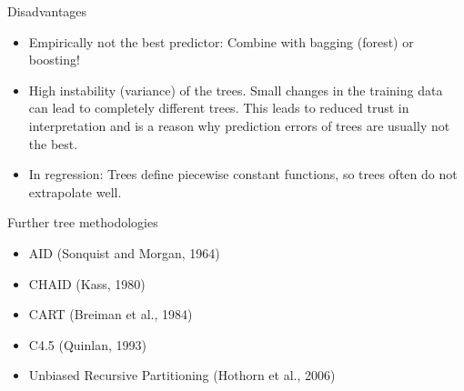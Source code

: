 \documentclass[11pt,compress,t,notes=noshow, xcolor=table]{beamer}
\begin{document}



\begin{vbframe}{Disadvantages}
\begin{itemize}
\item Empirically not the best predictor: Combine with bagging (forest) or boosting!
\item High instability (variance) of the trees.
  Small changes in the training data can lead to completely different trees. This leads to reduced trust in interpretation and is a reason why prediction errors of trees are usually not the best.
\item In regression: Trees define piecewise constant functions, so trees often do not extrapolate well.
\end{itemize}
\end{vbframe}

\begin{vbframe}{Further tree methodologies}

\begin{itemize}
\item AID (Sonquist and Morgan, 1964)
\item CHAID (Kass, 1980)
\item CART (Breiman et al., 1984)
\item C4.5 (Quinlan, 1993)
\item Unbiased Recursive Partitioning (Hothorn et al., 2006)
\end{itemize}

\end{vbframe}

\endlecture
\end{document}

